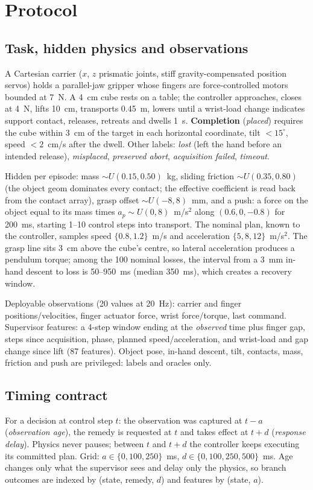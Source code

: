 \documentclass[conference]{IEEEtran}
\newcommand{\age}{a}
\newcommand{\del}{d}
\begin{document}
\section{Protocol}
\subsection{Task, hidden physics and observations}
A Cartesian carrier ($x$, $z$ prismatic joints, stiff gravity-compensated position servos) holds a parallel-jaw gripper whose fingers are force-controlled motors bounded at 7~N. A 4~cm cube rests on a table; the controller approaches, closes at 4~N, lifts 10~cm, transports 0.45~m, lowers until a wrist-load change indicates support contact, releases, retreats and dwells 1~s. \textbf{Completion} (\emph{placed}) requires the cube within 3~cm of the target in each horizontal coordinate, tilt $<15^\circ$, speed $<2$~cm/s after the dwell. Other labels: \emph{lost} (left the hand before an intended release), \emph{misplaced}, \emph{preserved abort}, \emph{acquisition failed}, \emph{timeout}.

Hidden per episode: mass $\sim U(0.15,0.50)$~kg, sliding friction $\sim U(0.35,0.80)$ (the object geom dominates every contact; the effective coefficient is read back from the contact array), grasp offset $\sim U(-8,8)$~mm, and a push: a force on the object equal to its mass times $a_p\sim U(0,8)$~m/s$^2$ along $(0.6,0,-0.8)$ for 200~ms, starting 1--10 control steps into transport. The nominal plan, known to the controller, samples speed $\{0.8,1.2\}$~m/s and acceleration $\{5,8,12\}$~m/s$^2$. The grasp line sits 3~cm above the cube's centre, so lateral acceleration produces a pendulum torque; among the 100 nominal losses, the interval from a 3~mm in-hand descent to loss is 50--950~ms (median 350~ms), which creates a recovery window.

Deployable observations (20 values at 20~Hz): carrier and finger positions/velocities, finger actuator force, wrist force/torque, last command. Supervisor features: a 4-step window ending at the \emph{observed} time plus finger gap, steps since acquisition, phase, planned speed/acceleration, and wrist-load and gap change since lift (87 features). Object pose, in-hand descent, tilt, contacts, mass, friction and push are privileged: labels and oracles only.

\subsection{Timing contract}
For a decision at control step $t$: the observation was captured at $t-\age$ (\emph{observation age}), the remedy is requested at $t$ and takes effect at $t+\del$ (\emph{response delay}). Physics never pauses; between $t$ and $t+\del$ the controller keeps executing its committed plan. Grid: $\age\in\{0,100,250\}$~ms, $\del\in\{0,100,250,500\}$~ms. Age changes only what the supervisor sees and delay only the physics, so branch outcomes are indexed by (state, remedy, $\del$) and features by (state, $\age$).
\end{document}
